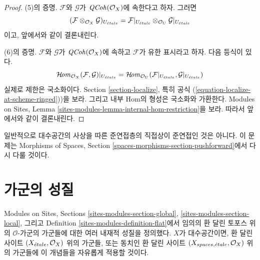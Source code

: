 \begin{proof}
\medskip\noindent
(5)의 증명. $\mathcal{F}$와 $\mathcal{G}$가
$\mathit{QCoh}(\mathcal{O}_X)$에 속한다고 하자. 그러면
$$
(\mathcal{F} \otimes_{\mathcal{O}_X} \mathcal{G})_{U_{\acute{e}tale}} =
\mathcal{F}|_{U_{\acute{e}tale}} \otimes_{\mathcal{O}_U} \mathcal{G}|_{U_{\acute{e}tale}}
$$
이고, 앞에서와 같이 결론내린다.

\medskip\noindent
(6)의 증명. $\mathcal{F}$와 $\mathcal{G}$가
$\mathit{QCoh}(\mathcal{O}_X)$에 속하고 $\mathcal{F}$가 유한 표시라고 하자.
다음 등식이 있다.
$$
\mathop{\mathcal{H}\!\mathit{om}}\nolimits_{\mathcal{O}_X}(\mathcal{F}, \mathcal{G})|_{U_{\acute{e}tale}} =
\mathop{\mathcal{H}\!\mathit{om}}\nolimits_{\mathcal{O}_U}(\mathcal{F}|_{U_{\acute{e}tale}}, \mathcal{G}|_{U_{\acute{e}tale}})
$$
실제로 제한은 국소화이다. Section \ref{section-localize}, 특히 공식
(\ref{equation-localize-at-scheme-ringed}))을 보라. 그리고 내부 Hom의
형성은 국소화와 가환한다. Modules on Sites, Lemma
\ref{sites-modules-lemma-internal-hom-restriction}을 보라. 따라서 앞에서와
같이 결론내린다.
\end{proof}

\noindent
일반적으로 대수공간의 사상을 따른 준연접층의 직접상이 준연접인 것은
아니다. 이 문제는 Morphisms of Spaces, Section
\ref{spaces-morphisms-section-pushforward}에서 다시 다룰 것이다.


\section{가군의 성질}
\label{section-properties-modules}

\noindent
Modules on Sites, Sections \ref{sites-modules-section-global},
\ref{sites-modules-section-local}, 그리고 Definition
\ref{sites-modules-definition-flat}에서 임의의 환 달린 토포스 위의
$\mathcal{O}$-가군의 가군들에 대한 여러 내재적 성질을 정의했다.
$X$가 대수공간이면, 환 달린 사이트
$(X_{\acute{e}tale}, \mathcal{O}_X)$ 위의 가군들, 또는 동치인 환 달린 사이트
$(X_{spaces, {\acute{e}tale}}, \mathcal{O}_X)$ 위의 가군들에 이 개념들을
자유롭게 적용할 것이다.

